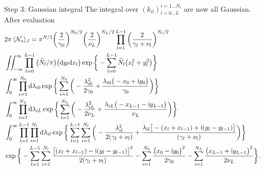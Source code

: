 \documentclass[8pt]{beamer}
\begin{document}
\begin{frame}[label={sec:org6ca474e}]{Step 3: Gaussian integral}
The integral over \((k_{il})_{l=0 \ldots L}^{i=1 \ldots N_{l}}\) are now all Gaussian. After evaluation
\begin{align*}
&2 \pi \thinspace \langle \mathcal{N}_{s} \rangle_{J} = \pi^{N/2} \bigg(\frac{2}{\gamma_{0}}\bigg)^{N_{0}/2} \bigg(\frac{2}{\nu_{L}}\bigg)^{N_{L}/2} \prod_{l=1}^{L-1} \bigg(\frac{2}{\gamma_{l} + \nu_{l}} \bigg)^{N_{l}/2} \\
&\iint_{-\infty}^{\infty} \prod_{l=0}^{L-1} \big(\widehat{N}_{l} / \pi \big)  \big( \mathrm{d} y_{l} \mathrm{d} x_{l} \big)  \exp \bigg\{ - \sum_{l=0}^{L-1} \widehat{N}_{l} \big( x_{l}^{2} + y_{l}^{2} \big) \bigg\} \\
&\int_0^{\infty} \prod_{i=1}^{N_0} \mathrm{d} \lambda_{i0} \exp \bigg \{ \sum_{i=1}^{N_{0}} \bigg( -\frac{\lambda_{i0}^{2}}{2 \gamma_{0}} + \frac{\lambda_{i0} \big(- x_{0} + \mathrm{i} y_{0}\big)}{\gamma_{0}} \bigg) \bigg \} \\
&\int_0^{\infty} \prod_{i=1}^{N_L} \mathrm{d} \lambda_{iL} \exp \bigg \{  \sum_{i=1}^{N_{L}} \bigg(- \frac{\lambda_{iL}^{2}}{2 \nu_{L}} + \frac{\lambda_{iL} \big(- x_{L-1} - \mathrm{i} y_{L-1}\big)}{\nu_{L}} \bigg) \bigg\} \\
&\int_0^{\infty} \prod_{l=1}^{L-1} \prod_{i=1}^{N_l} \mathrm{d} \lambda_{il} \exp \bigg\{ \sum_{l=1}^{L - 1} \sum_{i=1}^{N_{l}} \bigg( - \frac{\lambda_{il}^{2}}{2 (\gamma_{l} + \nu_{l})} + \frac{\lambda_{il} \big[- (x_{l} + x_{l-1}) + \mathrm{i} (y_{l} - y_{l-1})\big]}{(\gamma_{l} + \nu_{l})} \bigg) \bigg \} \\
&\exp \bigg\{ - \sum_{l=1}^{L - 1} \sum_{i=1}^{N_{l}} \frac{\big[(x_{l} + x_{l-1}) - \mathrm{i} (y_{l} - y_{l-1})\big]^{2}}{2 (\gamma_{l} + \nu_{l})} - \sum_{i=1}^{N_{0}} \frac{\big(x_{0} - \mathrm{i} y_{0}\big)^{2}}{2 \gamma_{0}} - \sum_{i=1}^{N_{L}} \frac{\big(x_{L-1} + \mathrm{i} y_{L-1}\big)^{2}}{2 \nu_{L}} \bigg\}.
\end{align*}
\end{frame}
\end{document}
